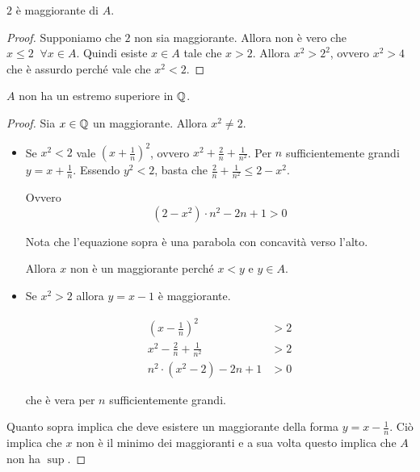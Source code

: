 \begin{proposition}
$2$ è maggiorante di $A$.
\end{proposition}
\begin{proof}
Supponiamo che $2$ non sia maggiorante. Allora non è vero che $x \le 2 \; \; \forall x \in A$. Quindi esiste $x \in A$ tale che $x > 2$. Allora $x^2 > 2^2$, ovvero $x^2 > 4$ che è assurdo perché vale che $x^2 < 2$.
\end{proof}
\begin{proposition}
$A$ non ha un estremo superiore in $\mathbb Q$.
\end{proposition}
\begin{proof}
Sia $x \in \mathbb Q$ un maggiorante. Allora $x^2 \neq 2$. 

\begin{itemize}
[1cm]
\item 
Se $x^2 < 2$ vale $(x+\frac{1}{n})^2$, ovvero $x^2 + \frac{2}{n} + \frac{1}{n^2}$.
Per $n$ sufficientemente grandi $y = x + \frac{1}{n}$. Essendo $y^2 < 2$, basta che $\frac{2}{n} + \frac{1}{n^2} \le 2 - x^2$.

Ovvero
\begin{equation*}
(2 - x^2) \cdot n^2 - 2n + 1 > 0 
\end{equation*} 

Nota che l'equazione sopra è una parabola con concavità verso l'alto. 

Allora $x$ non è un maggiorante perché $x < y$ e $y \in A$.

\item 
Se $x^2 > 2$ allora $y = x - 1$ è maggiorante.

\begin{align*}
(x-\frac{1}{n})^2 &> 2 \\
x^2 - \frac{2}{n} + \frac{1}{n^2} &> 2 \\
n^2 \cdot (x^2 - 2) - 2n + 1 &> 0
\end{align*}

che è vera per $n$ sufficientemente grandi.

\end{itemize}

Quanto sopra implica che deve esistere un maggiorante della forma $y = x - \frac{1}{n}$. Ciò implica che $x$ non è il minimo dei maggioranti e a sua volta questo implica che $A$ non ha $\sup$.

\end{proof}

